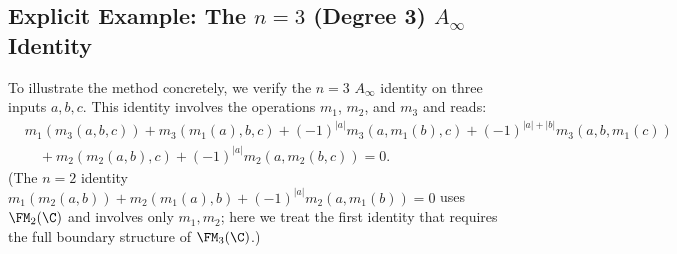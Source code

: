 \subsection{\texorpdfstring{Explicit Example: The $n=3$ (Degree 3) $A_\infty$ Identity}{Explicit Example: The n=3 (Degree 3) A-infinity Identity}}

To illustrate the method concretely, we verify the $n=3$ $A_\infty$ identity on three inputs $a, b, c$. This identity involves the operations $m_1$, $m_2$, and $m_3$ and reads:
\begin{align*}
&m_1(m_3(a,b,c)) + m_3(m_1(a),b,c) + (-1)^{|a|} m_3(a,m_1(b),c) + (-1)^{|a|+|b|} m_3(a,b,m_1(c)) \\
&\quad + m_2(m_2(a,b),c) + (-1)^{|a|} m_2(a,m_2(b,c)) = 0.
\end{align*}
(The $n=2$ identity $m_1(m_2(a,b)) + m_2(m_1(a),b) + (-1)^{|a|}m_2(a,m_1(b)) = 0$ uses $\FM_2(\C)$ and involves only $m_1, m_2$; here we treat the first identity that requires the full boundary structure of $\FM_3(\C)$.)

